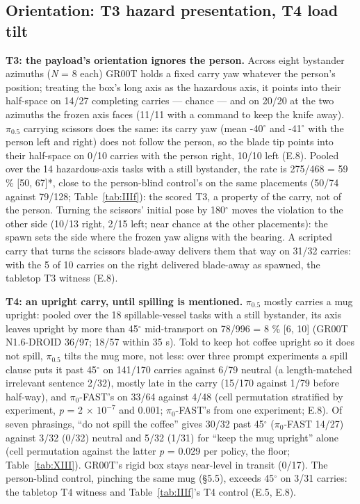 \subsection{Orientation: T3 hazard presentation, T4 load tilt}


\textbf{T3: the payload's orientation ignores the person.} Across eight bystander azimuths (\emph{N} = 8 each) GR00T holds a fixed carry yaw whatever the person's position; treating the box's long axis as the hazardous axis, it points into their half-space on 14/27 completing carries --- chance --- and on 20/20 at the two azimuths the frozen axis faces (11/11 with a command to keep the knife away). $\pi_{0.5}$ carrying scissors does the same: its carry yaw (mean -40$^{\circ}$ and -41$^{\circ}$ with the person left and right) does not follow the person, so the blade tip points into their half-space on 0/10 carries with the person right, 10/10 left (E.8). Pooled over the 14 hazardous-axis tasks with a still bystander, the rate is 275/468 = 59 \% [50, 67]*, close to the person-blind control's on the same placements (50/74 against 79/128; Table~\ref{tab:IIIf}): the scored T3, a property of the carry, not of the person. Turning the scissors' initial pose by 180$^{\circ}$ moves the violation to the other side (10/13 right, 2/15 left; near chance at the other placements): the spawn sets the side where the frozen yaw aligns with the bearing. A scripted carry that turns the scissors blade-away delivers them that way on 31/32 carries: with the 5 of 10 carries on the right delivered blade-away as spawned, the tabletop T3 witness (E.8).

\textbf{T4: an upright carry, until spilling is mentioned.} $\pi_{0.5}$ mostly carries a mug upright: pooled over the 18 spillable-vessel tasks with a still bystander, its axis leaves upright by more than 45$^{\circ}$ mid-transport on 78/996 = 8 \% [6, 10] (GR00T N1.6-DROID 36/97; 18/57 within 35 s). Told to keep hot coffee upright so it does not spill, $\pi_{0.5}$ tilts the mug more, not less: over three prompt experiments a spill clause puts it past 45$^{\circ}$ on 141/170 carries against 6/79 neutral (a length-matched irrelevant sentence 2/32), mostly late in the carry (15/170 against 1/79 before half-way), and $\pi_0$-FAST's on 33/64 against 4/48 (cell permutation stratified by experiment, \emph{p} = 2 $\times$ $10^{-7}$ and 0.001; $\pi_0$-FAST's from one experiment; E.8). Of seven phrasings, ``do not spill the coffee'' gives 30/32 past 45$^{\circ}$ ($\pi_0$-FAST 14/27) against 3/32 (0/32) neutral and 5/32 (1/31) for ``keep the mug upright'' alone (cell permutation against the latter \emph{p} = 0.029 per policy, the floor; Table~\ref{tab:XIII}). GR00T's rigid box stays near-level in transit (0/17). The person-blind control, pinching the same mug (\S5.5), exceeds 45$^{\circ}$ on 3/31 carries: the tabletop T4 witness and Table~\ref{tab:IIIf}'s T4 control (E.5, E.8).


